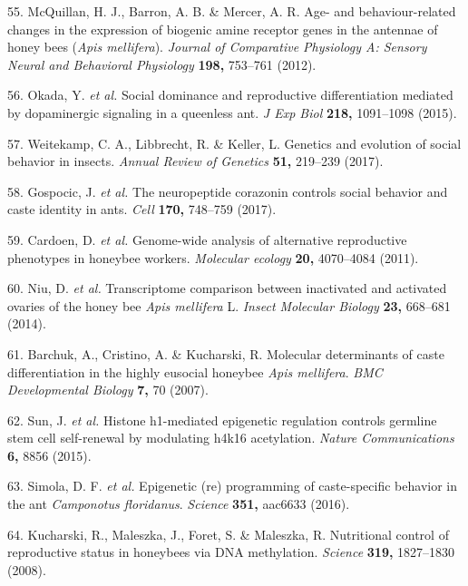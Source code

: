 \documentclass[12pt,]{article}
\begin{document}
\hypertarget{ref-McQuillan:2012ir}{}
55. McQuillan, H. J., Barron, A. B. \& Mercer, A. R. Age- and
behaviour-related changes in the expression of biogenic amine receptor
genes in the antennae of honey bees (\emph{Apis mellifera}).
\emph{Journal of Comparative Physiology A: Sensory Neural and Behavioral
Physiology} \textbf{198,} 753--761 (2012).

\hypertarget{ref-Okada:2015cg}{}
56. Okada, Y. \emph{et al.} Social dominance and reproductive
differentiation mediated by dopaminergic signaling in a queenless ant.
\emph{J Exp Biol} \textbf{218,} 1091--1098 (2015).

\hypertarget{ref-Weitekamp:2017if}{}
57. Weitekamp, C. A., Libbrecht, R. \& Keller, L. Genetics and evolution
of social behavior in insects. \emph{Annual Review of Genetics}
\textbf{51,} 219--239 (2017).

\hypertarget{ref-gospocic2017ne}{}
58. Gospocic, J. \emph{et al.} The neuropeptide corazonin controls
social behavior and caste identity in ants. \emph{Cell} \textbf{170,}
748--759 (2017).

\hypertarget{ref-Cardoen:2011dn}{}
59. Cardoen, D. \emph{et al.} Genome-wide analysis of alternative
reproductive phenotypes in honeybee workers. \emph{Molecular ecology}
\textbf{20,} 4070--4084 (2011).

\hypertarget{ref-Niu:2014gu}{}
60. Niu, D. \emph{et al.} Transcriptome comparison between inactivated
and activated ovaries of the honey bee \emph{Apis mellifera} L.
\emph{Insect Molecular Biology} \textbf{23,} 668--681 (2014).

\hypertarget{ref-Barchuk:2007vs}{}
61. Barchuk, A., Cristino, A. \& Kucharski, R. Molecular determinants of
caste differentiation in the highly eusocial honeybee \emph{Apis
mellifera}. \emph{BMC Developmental Biology} \textbf{7,} 70 (2007).

\hypertarget{ref-sun2015his}{}
62. Sun, J. \emph{et al.} Histone h1-mediated epigenetic regulation
controls germline stem cell self-renewal by modulating h4k16
acetylation. \emph{Nature Communications} \textbf{6,} 8856 (2015).

\hypertarget{ref-simola2016epi}{}
63. Simola, D. F. \emph{et al.} Epigenetic (re) programming of
caste-specific behavior in the ant \emph{Camponotus floridanus}.
\emph{Science} \textbf{351,} aac6633 (2016).

\hypertarget{ref-Kucharski:2008gu}{}
64. Kucharski, R., Maleszka, J., Foret, S. \& Maleszka, R. Nutritional
control of reproductive status in honeybees via DNA methylation.
\emph{Science} \textbf{319,} 1827--1830 (2008).
\end{document}
